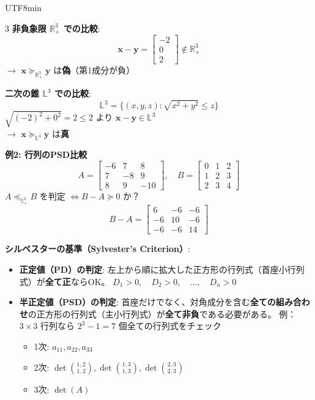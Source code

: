 \documentclass[8pt,a4paper]{article}
\begin{document}
\begin{CJK}{UTF8}{min}
\begin{multicols}{3}
\textbf{非負象限 $\mathbb{R}_+^3$ での比較}:
\[
\boldsymbol{x} - \boldsymbol{y} = \begin{bmatrix} -2 \\ 0 \\ 2 \end{bmatrix} \notin \mathbb{R}_+^3
\]
$\to$ $\boldsymbol{x} \succeq_{\mathbb{R}_+^3} \boldsymbol{y}$ は\textbf{偽}（第1成分が負）

\textbf{二次の錐 $\mathbb{L}^3$ での比較}:
\[
\mathbb{L}^3 = \{(x,y,z): \sqrt{x^2+y^2} \leq z\}
\]
$\sqrt{(-2)^2 + 0^2} = 2 \leq 2$ より $\boldsymbol{x} - \boldsymbol{y} \in \mathbb{L}^3$\\
$\to$ $\boldsymbol{x} \succeq_{\mathbb{L}^3} \boldsymbol{y}$ は\textbf{真}

\textbf{例2: 行列のPSD比較}
\[
A = \begin{bmatrix} -6 & 7 & 8 \\ 7 & -8 & 9 \\ 8 & 9 & -10 \end{bmatrix}, \quad
B = \begin{bmatrix} 0 & 1 & 2 \\ 1 & 2 & 3 \\ 2 & 3 & 4 \end{bmatrix}
\]
$A \preceq_{\mathbb{S}_+^3} B$ を判定 $\Leftrightarrow B-A \succeq 0$ か？
\[
B-A = \begin{bmatrix} 6 & -6 & -6 \\ -6 & 10 & -6 \\ -6 & -6 & 14 \end{bmatrix}
\]

\textbf{シルベスターの基準（Sylvester's Criterion）}:
\begin{itemize}
    \item \textbf{正定値（PD）の判定}:
    左上から順に拡大した正方形の行列式（首座小行列式）が\textbf{全て正}ならOK。
    $D_1 > 0, \quad D_2 > 0, \quad \ldots, \quad D_n > 0$
    
    \item \textbf{半正定値（PSD）の判定}:
    首座だけでなく、対角成分を含む\textbf{全ての組み合わせ}の正方形の行列式（主小行列式）が\textbf{全て非負}である必要がある。
    例：$3 \times 3$ 行列なら $2^3 - 1 = 7$ 個全ての行列式をチェック
    \begin{itemize}
        \item 1次: $a_{11}, a_{22}, a_{33}$
        \item 2次: $\det\binom{1,2}{1,2}, \det\binom{1,3}{1,3}, \det\binom{2,3}{2,3}$
        \item 3次: $\det(A)$
    \end{itemize}
\end{itemize}


\end{multicols}
\end{CJK}
\end{document}
